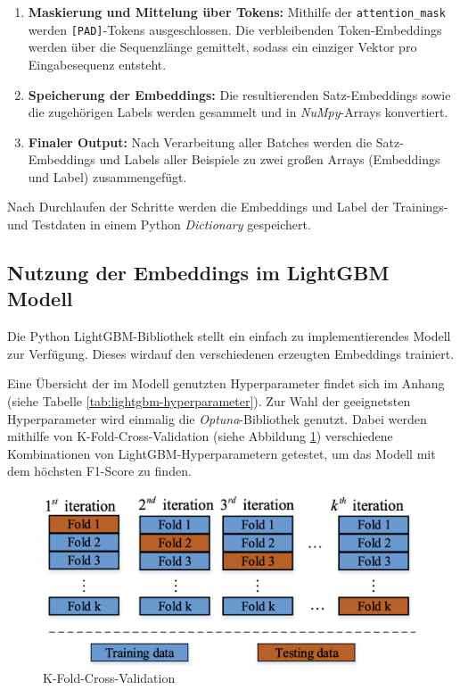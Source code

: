 \begin{enumerate}
  \item \textbf{Maskierung und Mittelung über Tokens:}  
  Mithilfe der \texttt{attention\_mask} werden \texttt{[PAD]}-Tokens ausgeschlossen. 
  Die verbleibenden Token-Embeddings werden über die Sequenzlänge gemittelt, sodass ein einziger Vektor pro Eingabesequenz entsteht.

  \item \textbf{Speicherung der Embeddings:}  
  Die resultierenden Satz-Embeddings sowie die zugehörigen Labels werden gesammelt und in \textit{NuMpy}-Arrays konvertiert.

  \item \textbf{Finaler Output:}  
  Nach Verarbeitung aller Batches werden die Satz-Embeddings und Labels aller Beispiele zu zwei großen Arrays (Embeddings und Label) zusammengefügt.
\end{enumerate} %

Nach Durchlaufen der Schritte werden die Embeddings und Label der Trainings- und Testdaten in einem Python \textit{Dictionary} gespeichert.

\subsection{Nutzung der Embeddings im LightGBM Modell}

Die Python LightGBM-Bibliothek stellt ein einfach zu implementierendes Modell zur Verfügung.
Dieses wirdauf den verschiedenen erzeugten Embeddings trainiert.

Eine Übersicht der im Modell genutzten Hyperparameter findet sich im Anhang (siehe Tabelle \ref{tab:lightgbm-hyperparameter}).
Zur Wahl der geeignetsten Hyperparameter wird einmalig die \textit{Optuna}-Bibliothek genutzt.
Dabei werden mithilfe von K-Fold-Cross-Validation (siehe Abbildung \ref{fig:k-fold_cross-validation}) verschiedene Kombinationen von LightGBM-Hyperparametern getestet, 
um das Modell mit dem höchsten F1-Score zu finden.

\begin{figure}[htbp]
    \begin{center}
        \includegraphics[scale=0.4]{static/k-fold_cross-validation.png}
        \caption{\label{fig:k-fold_cross-validation} K-Fold-Cross-Validation \cite{isaac2021}}
    \end{center}
\end{figure}

